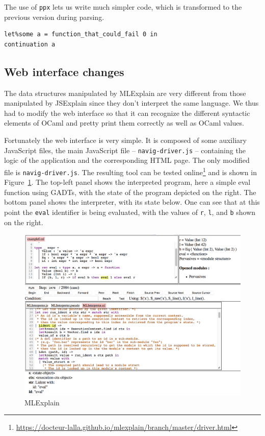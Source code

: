 \documentclass[twocolumn,a4paper]{article} \usepackage[utf8]{inputenc}
\begin{document}
The use of \texttt{ppx} lets us write much simpler code, which is transformed to
the previous version during parsing.
\begin{verbatim}
let%some a = function_that_could_fail 0 in
continuation a
\end{verbatim}

\subsection{Web interface changes}

The data structures manipulated by MLExplain are very different from those
manipulated by JSExplain since they don't interpret the same language. We thus
had to modify the web interface so that it can recognize the different syntactic
elements of OCaml and pretty print them correctly as well as OCaml values.

Fortunately the web interface is very simple. It is composed of some auxiliary
JavaScript files, the main JavaScript file -- \texttt{navig-driver.js} --
containing the logic of the application and the corresponding HTML page. The
only modified file is \texttt{navig-driver.js}. The resulting tool can be tested
online\footnote{\url{https://docteur-lalla.github.io/mlexplain/branch/master/driver.html}}
and is shown in Figure~\ref{fig:mlexplain}. The top-left panel shows the
interpreted program, here a simple eval function using GADTs, with the state of the
program depicted on the right. The bottom panel shows the
interpreter, with its state below. One can see that at this point the
\texttt{eval} identifier is being evaluated, with the values of \texttt{r},
\texttt{l}, and \texttt{b} shown on the right.

\begin{figure}
  \centering
  \includegraphics[width=17cm]{mlexplain.png}
  \caption{MLExplain}
  \label{fig:mlexplain}
\end{figure}
\end{document}
